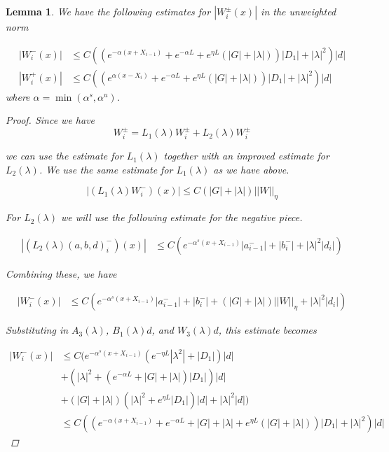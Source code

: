 \documentclass[12pt]{article}
\newtheorem{lemma}{Lemma}
\begin{document}
\begin{lemma}
We have the following estimates for $|W_i^\pm(x)|$ in the unweighted norm

\begin{align*}
| W_i^-(x)| &\leq C\left(\left( e^{-\alpha(x + X_{i-1})} + e^{-\alpha L} + e^{\eta L}(|G| + |\lambda|) \right)|D_1| + |\lambda|^2 \right) |d| \\
| W_i^+(x)| &\leq C\left(\left( e^{\alpha(x - X_{i})} + e^{-\alpha L} + e^{\eta L}(|G| + |\lambda|) \right)|D_1| + |\lambda|^2 \right) |d|
\end{align*}
where $\alpha = \min(\alpha^s, \alpha^u)$.

\begin{proof}
Since we have 
\[
W_i^\pm = L_1(\lambda)W_i^\pm + L_2(\lambda)W_i^\pm 
\]

we can use the estimate for $L_1(\lambda)$ together with an improved estimate for $L_2(\lambda)$. We use the same estimate for $L_1(\lambda)$ as we have above.

\[
| (L_1(\lambda) W_i^-)(x) | \leq C\left(|G| +|\lambda|\right)||W||_\eta
\]

For $L_2(\lambda)$ we will use the following estimate for the negative piece.

\begin{align*}
| (L_2(\lambda)(a, b, d)_i^-)(x)| &\leq C \left( e^{-\alpha^s(x + X_{i-1})} |a^-_{i-1}| + |b_i^-| + |\lambda|^2 |d_i| \right)
\end{align*}

Combining these, we have

\begin{align*}
| W_i^-(x)| &\leq C \left( e^{-\alpha^s(x + X_{i-1})} |a^-_{i-1}| + |b_i^-| + \left(|G| +|\lambda|\right)||W||_\eta + |\lambda|^2 |d_i| \right)
\end{align*}

Substituting in $A_3(\lambda)$, $B_1(\lambda)d$, and $W_3(\lambda)d$, this estimate becomes

\begin{align*}
| W_i^-(x)| &\leq C ( e^{-\alpha^s(x + X_{i-1})} \left( e^{-\eta L}|\lambda^2| + |D_1| \right)|d| \\
&+ (|\lambda|^2 + (e^{-\alpha L} + |G| + |\lambda|)|D_1| )|d| \\
&+ \left(|G| +|\lambda|\right)\left( |\lambda|^2 + e^{\eta L}|D_1|\right)|d| + |\lambda|^2 |d| )\\
&\leq C\left(\left( e^{-\alpha(x + X_{i-1})} + e^{-\alpha L} + |G| + |\lambda| + e^{\eta L}(|G| + |\lambda|) \right)|D_1| + |\lambda|^2 \right) |d|
\end{align*}


\end{proof}
\end{lemma}
\end{document}
